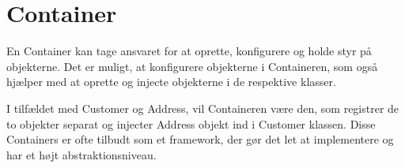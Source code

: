 

\section{Container}

En Container kan tage ansvaret for at oprette, konfigurere og holde styr på objekterne. Det er muligt, at konfigurere objekterne i Containeren, som også hjælper med at oprette og injecte objekterne i de respektive klasser. 

I tilfældet med Customer og Address, vil Containeren være den, som registrer de to objekter separat og injecter Address objekt ind i Customer klassen. Disse Containers er ofte tilbudt som et framework, der gør det let at implementere og har et højt abstraktionsniveau.
